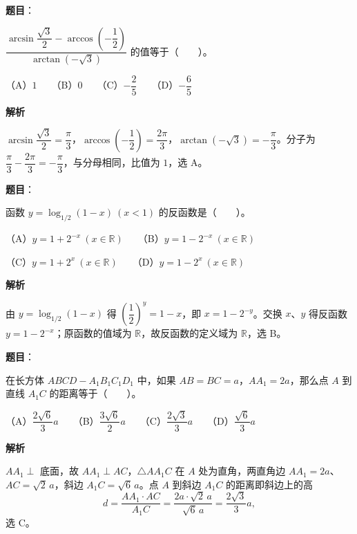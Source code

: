 \begin{answer}

\textbf{题目}：

$\dfrac{\arcsin\dfrac{\sqrt3}{2}-\arccos\left(-\dfrac12\right)}{\arctan(-\sqrt3)}$ 的值等于\mbox{（　　）}。

（A）$1$　　（B）$0$　　（C）$-\dfrac25$　　（D）$-\dfrac65$

\textbf{解析}

$\arcsin\dfrac{\sqrt3}{2}=\dfrac{\pi}{3}$，$\arccos\left(-\dfrac12\right)=\dfrac{2\pi}{3}$，$\arctan(-\sqrt3)=-\dfrac{\pi}{3}$。分子为 $\dfrac{\pi}{3}-\dfrac{2\pi}{3}=-\dfrac{\pi}{3}$，与分母相同，比值为 $1$，选 A。


\end{answer}
\begin{answer}

\textbf{题目}：

函数 $y=\log_{1/2}(1-x)\ (x<1)$ 的反函数是\mbox{（　　）}。

（A）$y=1+2^{-x}\ (x\in\mathbb R)$　　（B）$y=1-2^{-x}\ (x\in\mathbb R)$

（C）$y=1+2^x\ (x\in\mathbb R)$　　（D）$y=1-2^x\ (x\in\mathbb R)$

\textbf{解析}

由 $y=\log_{1/2}(1-x)$ 得 $\left(\dfrac12\right)^y=1-x$，即 $x=1-2^{-y}$。交换 $x$、$y$ 得反函数 $y=1-2^{-x}$；原函数的值域为 $\mathbb R$，故反函数的定义域为 $\mathbb R$，选 B。


\end{answer}
\begin{answer}

\textbf{题目}：

在长方体 $ABCD-A_1B_1C_1D_1$ 中，如果 $AB=BC=a$，$AA_1=2a$，那么点 $A$ 到直线 $A_1C$ 的距离等于\mbox{（　　）}。

（A）$\dfrac{2\sqrt6}{3}a$　　（B）$\dfrac{3\sqrt6}{2}a$　　（C）$\dfrac{2\sqrt3}{3}a$　　（D）$\dfrac{\sqrt6}{3}a$

\textbf{解析}

$AA_1\perp$ 底面，故 $AA_1\perp AC$，$\triangle AA_1C$ 在 $A$ 处为直角，两直角边 $AA_1=2a$、$AC=\sqrt2\,a$，斜边 $A_1C=\sqrt6\,a$。点 $A$ 到斜边 $A_1C$ 的距离即斜边上的高
\nopagebreak[4]
\[
d=\frac{AA_1\cdot AC}{A_1C}=\frac{2a\cdot\sqrt2\,a}{\sqrt6\,a}=\frac{2\sqrt3}{3}a,
\]
选 C。


\end{answer}
